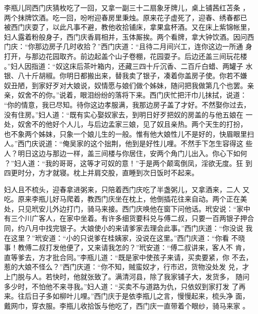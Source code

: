 李瓶儿同西门庆猜枚吃了一回，又拿一副三十二扇象牙牌儿，桌上铺茜红苫条
，两个抹牌饮酒。吃一回，吩咐迎春房里秉烛。原来花子虚死了，迎春、绣春都已
被西门庆耍了，以此凡事不避，教他收拾铺床，拿果盒杯酒。又在床上紫锦帐里，
妇人露着粉般身子，西门庆香肩相并，玉体厮挨。两个看牌，拿大钟饮酒。因问西
门庆：“你那边房子几时收拾？”西门庆道：“且待二月间兴工，连你这边一所通
身打开，与那边花园取齐。前边起盖个山子卷棚，花园耍子。后边还盖三间玩花楼
。”妇人因指道：“奴这床后茶叶箱内，还藏三四十斤沉香、二百斤白蜡、两罐子
水银、八十斤胡椒。你明日都搬出来，替我卖了银子，凑着你盖房子使。你若不嫌
奴丑陋，到家好歹对大娘说，奴情愿与娘们做个姊妹，随问把我做第几个也罢。亲
亲，奴舍不的你。”说着，眼泪纷纷的落将下来。西门庆忙把汗巾儿抹拭，说道：
“你的情意，我已尽知。待你这边孝服满，我那边房子盖了才好。不然娶你过去，
没有住房。”妇人道：“既有实心娶奴家去，到明日好歹把奴的房盖的与他五娘在
一处，奴舍不的他好个人儿，与后边孟家三娘，见了奴且亲热。两个天生的打扮，
也不象两个姊妹，只象一个娘儿生的一般。惟有他大娘性儿不是好的，快眉眼里扫
人。”西门庆说道：“俺吴家的这个拙荆，他到是好性儿哩。不然手下怎生容得这
些人？明日这边与那边一样，盖三间楼与你居住，安两个角门儿出入。你心下如何
？”妇人道：“我的哥哥，这等才可奴的意！”于是两个颠鸾倒凤，淫欲无度。狂
到四更时分，方才就寝。枕上并肩交股，直睡到次日饭时不起来。

妇人且不梳头，迎春拿进粥来，只陪着西门庆吃了半盏粥儿，又拿酒来，二人
又吃。原来李瓶儿好马爬着，教西门庆坐在枕上，他倒插花往来自动。两个正在美
处，只见玳安儿外边打门，骑马来接。西门庆唤他在窗下问他话。玳安说：“家中
有三个川广客人，在家中坐着。有许多细货要科兑与傅二叔，只要一百两银子押合
同，约八月中找完银子。大娘使小的来请爹家去理会此事。”西门庆道：“你没说
我在这里？”玳安道：“小的只说爹在桂姨家，没说在这里。”西门庆道：“你看
不晓事！教傅二叔打发他便了，又来请我怎的？”玳安道：“傅二叔讲来，客人不
肯，直等爹去，方才批合同。”李瓶儿道：“既是家中使孩子来请，买卖要紧，你
不去，惹的大娘不怪么？”西门庆道：“你不知，贼蛮奴才，行市迟，货物没处发
兑，才上门脱与人。若快时，他就张致了。满清河县，除了我家铺子大，发货多，
随问多少时，不怕他不来寻我。”妇人道：“买卖不与道路为仇，只依奴到家打发
了再来。往后日子多如柳叶儿哩。”西门庆于是依李瓶儿之言，慢慢起来，梳头净
面，戴网巾，穿衣服。李瓶儿收拾饭与他吃了，西门庆一直带着个眼纱，骑马来家
。

